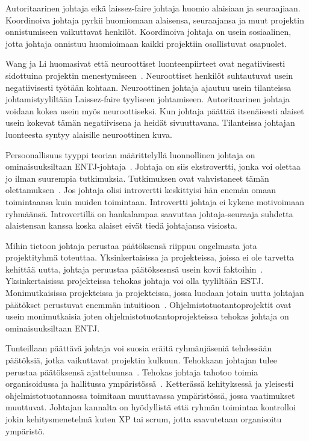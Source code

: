 \documentclass[finnish]{tktltiki2}
\theoremstyle{definition}
\theoremstyle{remark}
\begin{document}
Autoritaarinen johtaja eikä laissez-faire johtaja huomio alaisiaan ja seuraajiaan. Koordinoiva johtaja pyrkii huomiomaan alaisensa, seuraajansa ja muut projektin onnistumiseen vaikuttavat henkilöt. Koordinoiva johtaja on usein sosiaalinen, jotta johtaja onnistuu huomioimaan kaikki projektiin osallistuvat osapuolet. 

Wang ja Li huomasivat että neuroottiset luonteenpiirteet ovat negatiivisesti sidottuina projektin menestymiseen~\cite{Wang:2009:PMP:1639950.1640049}. Neuroottiset henkilöt suhtautuvat usein negatiivisesti työtään kohtaan. Neuroottinen johtaja ajautuu usein tilanteissa johtamistyyliltään Laissez-faire tyyliseen johtamiseen. Autoritaarinen johtaja voidaan kokea usein myös neuroottiseksi. Kun johtaja päättää itsenäisesti alaiset usein kokevat tämän negatiivisena ja heidät sivuuttavana. Tilanteissa johtajan luonteesta syntyy alaisille neuroottinen kuva.

Persoonallisuus tyyppi teorian määrittelyllä luonnollinen johtaja on ominaisuuksiltaan ENTJ-johtaja~\cite{bradley1997effect}. Johtaja on siis ekstrovertti, jonka voi olettaa jo ilman suurempia tutkimuksia. Tutkimuksen ovat vahvistaneet tämän olettamuksen~\cite{bradley1997effect}. Jos johtaja olisi introvertti keskittyisi hän enemän omaan toimintaansa kuin muiden toimintaan. Introvertti johtaja ei kykene motivoimaan ryhmäänsä. Introvertillä on hankalampaa saavuttaa johtaja-seuraaja suhdetta alaistensan kanssa koska alaiset eivät tiedä johtajansa visiosta.   

Mihin tietoon johtaja perustaa päätöksensä riippuu ongelmasta jota projektityhmä toteuttaa. Yksinkertaisissa ja projekteissa, joissa ei ole tarvetta kehittää uutta, johtaja peruustaa päätöksesnsä usein kovii faktoihin~\cite{bradley1997effect}. Yksinkertaisissa projekteissa tehokas johtaja voi olla tyyliltään ESTJ. Monimutkaisissa projekteissa ja projekteissa, jossa luodaan jotain uutta johtajan päätökset perustuvat enemmän intuitioon~\cite{bradley1997effect}. Ohjelmistotuotantoprojektit ovat usein monimutkaisia joten ohjelmistotuotantoprojekteissa tehokas johtaja on ominaisuuksiltaan ENTJ.  

Tunteillaan päättävä johtaja voi suosia eräitä ryhmänjäseniä tehdessään päätöksiä, jotka vaikuttavat projektin kulkuun. Tehokkaan johtajan tulee perustaa päätöksensä ajatteluunsa~\cite{bradley1997effect}. Tehokas johtaja tahotoo toimia organisoidussa ja hallitussa ympäristössä~\cite{bradley1997effect}. Ketterässä kehityksessä ja yleisesti ohjelmistotuotannossa toimitaan muuttavassa ympäristössä, jossa vaatimukset muuttuvat. Johtajan kannalta on hyödyllistä että ryhmän toimintaa kontrolloi jokin kehitysmenetelmä kuten XP tai scrum, jotta saavutetaan organisoitu ympäristö.
\end{document}
